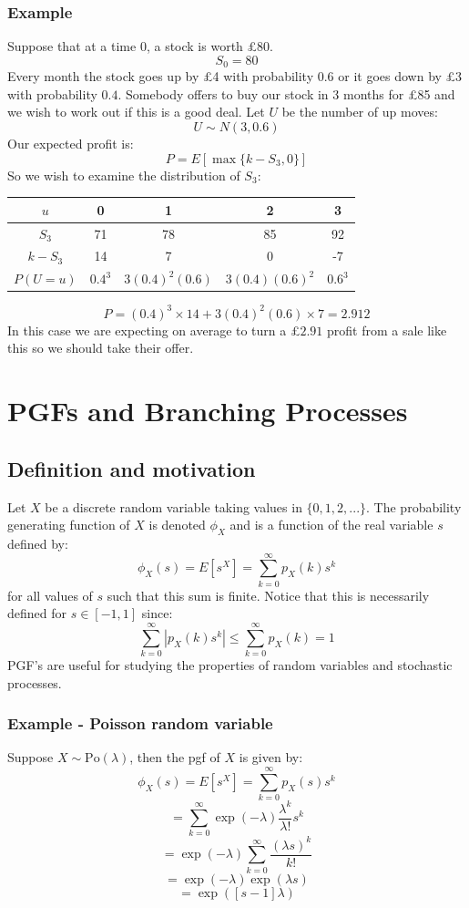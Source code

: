 \documentclass[12pt]{article}
\begin{document}
\subsubsection*{Example}
Suppose that at a time \(0\), a stock is worth £80.
\[S_0=80\]
Every month the stock goes up by £4 with probability \(0.6\) or it goes down by £3 with probability \(0.4\). Somebody offers to buy our stock in 3 months for £85 and we wish to work out if this is a good deal. Let \(U\) be the number of up moves:
\[U\sim N(3,0.6)\]
Our expected profit is:
\[P=E[\max\{k-S_3,0\}]\]
So we wish to examine the distribution of \(S_3\):
\begin{table}[H]
    \centering
    \begin{tabular}{c|c c c c}
        \(u\) & 0 & 1 & 2 & 3 \\ \hline
        \(S_3\) & 71 & 78 & 85 & 92 \\
        \(k-S_3\) & 14 & 7 & 0 & -7 \\
        \(P(U=u)\) & \(0.4^3\) & \(3(0.4)^2(0.6)\) & \(3(0.4)(0.6)^2\) & \(0.6^3\)
    \end{tabular}
\end{table}
\[P=(0.4)^3\times 14+3(0.4)^2(0.6)\times 7=2.912\]
In this case we are expecting on average to turn a £\(2.91\) profit from a sale like this so we should take their offer.
\section*{PGFs and Branching Processes}
\subsection*{Definition and motivation}
Let \(X\) be a discrete random variable taking values in \(\{0,1,2,...\}\). The probability generating function of \(X\) is denoted \(\phi_X\) and is a function of the real variable \(s\) defined by:
\[\phi_X(s)=E[s^X]=\sum_{k=0}^\infty p_X(k)s^k\]
for all values of \(s\) such that this sum is finite. Notice that this is necessarily defined for \(s\in[-1,1]\) since:
\[\sum^\infty_{k=0} |p_X(k)s^k|\leq\sum^\infty_{k=0}p_X(k)=1\]
PGF's are useful for studying the properties of random variables and stochastic processes.
\subsubsection*{Example - Poisson random variable}
Suppose \(X\sim \text{Po}(\lambda)\), then the pgf of \(X\) is given by:
\[\phi_X(s)=E[s^X]=\sum^\infty_{k=0}p_X(s)s^k\]
\[=\sum^\infty_{k=0}\exp(-\lambda)\frac{\lambda^k}{\lambda!}s^k\]
\[=\exp(-\lambda)\sum^\infty_{k=0}\frac{(\lambda s)^k}{k!}\]
\[=\exp(-\lambda)\exp(\lambda s)\]
\[=\exp([s-1]\lambda)\]
\end{document}
